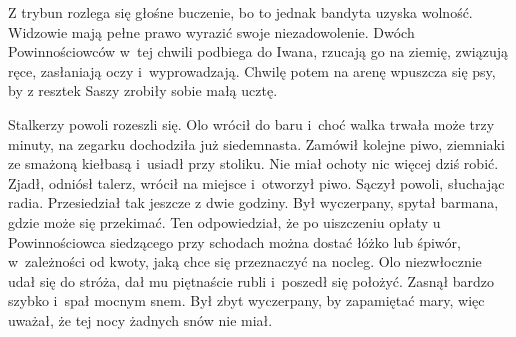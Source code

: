 \documentclass[../MAIN.tex]{subfiles}
\begin{document}
Z trybun rozlega się głośne buczenie, bo to jednak bandyta uzyska wolność. Widzowie mają pełne prawo wyrazić swoje niezadowolenie. Dwóch Powinnościowców w~tej chwili podbiega do Iwana, rzucają go na ziemię, związują ręce, zasłaniają oczy i~wyprowadzają. Chwilę potem na arenę wpuszcza się psy, by z resztek Saszy zrobiły sobie małą ucztę.%

\mm Stalkerzy powoli rozeszli się. Olo wrócił do baru i~choć walka trwała może trzy minuty, na zegarku dochodziła już siedemnasta. Zamówił kolejne piwo, ziemniaki ze smażoną kiełbasą i~usiadł przy stoliku. Nie miał ochoty nic więcej dziś robić. Zjadł, odniósł talerz, wrócił na miejsce i~otworzył piwo. Sączył powoli, słuchając radia. Przesiedział tak jeszcze z dwie godziny. Był wyczerpany, spytał barmana, gdzie może się przekimać. Ten odpowiedział, że po uiszczeniu opłaty u Powinnościowca siedzącego przy schodach można dostać łóżko lub śpiwór, w~zależności od kwoty, jaką chce się przeznaczyć na nocleg.
\pp
Olo niezwłocznie udał się do stróża, dał mu piętnaście rubli i~poszedł się położyć. Zasnął bardzo szybko i~spał mocnym snem. Był zbyt wyczerpany, by zapamiętać mary, więc uważał, że tej nocy żadnych snów nie miał.
\end{document}
